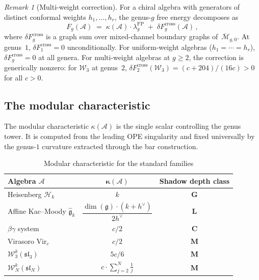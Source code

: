 \documentclass[11pt,reqno]{amsart}
\theoremstyle{definition}
\theoremstyle{remark}
\newtheorem{remark}[theorem]{Remark}
\providecommand{\cA}{\mathcal{A}}
\providecommand{\cH}{\mathcal{H}}
\providecommand{\cM}{\mathcal{M}}
\providecommand{\fg}{\mathfrak{g}}
\providecommand{\Vir}{\mathrm{Vir}}
\numberwithin{equation}{section}
\begin{document}
\begin{remark}[Multi-weight correction]
\label{rem:multi-weight}
For a chiral algebra with generators of distinct conformal
weights $h_1, \ldots, h_r$, the genus-$g$ free energy
decomposes as
\begin{equation}\label{eq:multi-weight-decomposition}
F_g(\cA)
\;=\;
\kappa(\cA) \cdot \lambda_g^{\mathrm{FP}}
\;+\;
\delta F_g^{\mathrm{cross}}(\cA)\,,
\end{equation}
where $\delta F_g^{\mathrm{cross}}$ is a graph sum over
mixed-channel boundary graphs of~$\overline{\cM}_{g,0}$.
At genus~$1$, $\delta F_1^{\mathrm{cross}} = 0$
unconditionally. For uniform-weight algebras
($h_1 = \cdots = h_r$),
$\delta F_g^{\mathrm{cross}} = 0$ at all genera. For
multi-weight algebras at $g \ge 2$, the correction is
generically nonzero: for $\mathcal{W}_3$ at genus~$2$,
$\delta F_2^{\mathrm{cross}}(\mathcal{W}_3)
= (c + 204)/(16c) > 0$ for all $c > 0$.
\end{remark}

\subsection{The modular characteristic}
\label{ssec:kappa}

The modular characteristic $\kappa(\cA)$ is the single
scalar controlling the genus tower. It is computed from
the leading OPE singularity and fixed universally by the
genus-$1$ curvature extracted through the bar construction.

\begin{table}[ht]
\centering
\caption{Modular characteristic for the standard families}
\label{tab:kappa}
\renewcommand{\arraystretch}{1.6}
\begin{tabular}{lcc}
\toprule
\textbf{Algebra $\cA$}
 & $\boldsymbol{\kappa(\cA)}$
 & \textbf{Shadow depth class} \\
\midrule
Heisenberg $\cH_k$
 & $k$
 & $\mathbf{G}$ \\
Affine Kac--Moody $\widehat{\fg}_k$
 & $\dfrac{\dim(\fg) \cdot (k + h^\vee)}{2h^\vee}$
 & $\mathbf{L}$ \\[4pt]
$\beta\gamma$ system
 & $c/2$
 & $\mathbf{C}$ \\
Virasoro $\Vir_c$
 & $c/2$
 & $\mathbf{M}$ \\
$\mathcal{W}_3^k(\mathfrak{sl}_3)$
 & $5c/6$
 & $\mathbf{M}$ \\
$\mathcal{W}_N^k(\mathfrak{sl}_N)$
 & $\displaystyle c \cdot \sum_{j=2}^{N}\frac{1}{j}$
 & $\mathbf{M}$ \\[4pt]
\bottomrule
\end{tabular}
\end{table}
\end{document}
